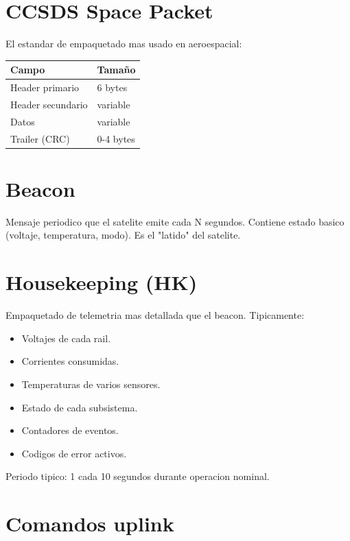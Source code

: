 \documentclass[11pt,a4paper,oneside,openright]{book}
\begin{document}
\section{CCSDS Space Packet}

El estandar de empaquetado mas usado en aeroespacial:

\begin{center}
\begin{tabular}{ll}
\toprule
\textbf{Campo} & \textbf{Tamaño} \\
\midrule
Header primario             & 6 bytes \\
Header secundario           & variable \\
Datos                       & variable \\
Trailer (CRC)               & 0-4 bytes \\
\bottomrule
\end{tabular}
\end{center}

\section{Beacon}

Mensaje periodico que el satelite emite cada N segundos. Contiene
estado basico (voltaje, temperatura, modo). Es el "latido" del satelite.

\section{Housekeeping (HK)}

Empaquetado de telemetria mas detallada que el beacon. Tipicamente:
\begin{itemize}[leftmargin=2em]
  \item Voltajes de cada rail.
  \item Corrientes consumidas.
  \item Temperaturas de varios sensores.
  \item Estado de cada subsistema.
  \item Contadores de eventos.
  \item Codigos de error activos.
\end{itemize}

Periodo tipico: 1 cada 10 segundos durante operacion nominal.

\section{Comandos uplink}
\end{document}
